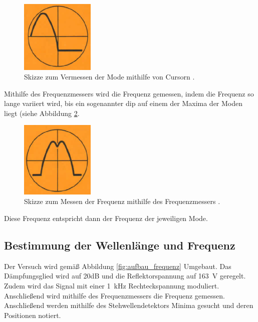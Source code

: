 \begin{figure}
  \centering
  \includegraphics[width=100pt]{data/seite.png}
  \caption{Skizze zum Vermessen der Mode mithilfe von Cursorn \cite{Versuchsanleitung_alt}.}
  \label{fig:seite}
\end{figure}

Mithilfe des Frequenzmessers
wird die Frequenz gemessen, indem die Frequenz so lange variiert wird, bis ein
sogenannter dip auf einem der Maxima der Moden liegt (siehe Abbildung \ref{fig:dip}.

\begin{figure}
  \centering
  \includegraphics[width=100pt]{data/dip.png}
  \caption{Skizze zum Messen der Frequenz mithilfe des Frequenzmessers \cite{Versuchsanleitung_alt}.}
  \label{fig:dip}
\end{figure}

Diese Frequenz entspricht dann der Frequenz der jeweiligen Mode.

\subsection{Bestimmung der Wellenlänge und Frequenz}
\label{subsec:frequenz}
Der Versuch wird gemäß Abbildung \ref{fig:aufbau_frequenz} Umgebaut. Das Dämpfungsglied
wird auf 20dB und die Reflektorspannung auf \SI{163}{\volt} geregelt. Zudem wird das
Signal mit einer \SI{1}{\kilo\hertz} Rechteckspannung moduliert. Anschließend wird
mithilfe des Frequenzmessers die Frequenz gemessen. Anschließend werden mithilfe des
Stehwellendetektors Minima gesucht und deren Positionen notiert.

